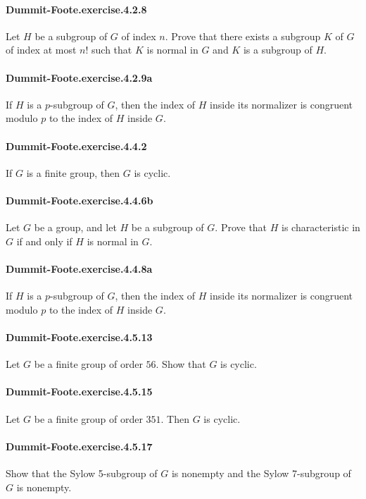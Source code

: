 \documentclass{article}
\begin{document}
\paragraph{Dummit-Foote.exercise.4.2.8} Let $H$ be a subgroup of $G$ of index $n$. Prove that there exists a subgroup $K$ of $G$ of index at most $n!$ such that $K$ is normal in $G$ and $K$ is a subgroup of $H$.

\paragraph{Dummit-Foote.exercise.4.2.9a} If $H$ is a $p$-subgroup of $G$, then the index of $H$ inside its normalizer is congruent modulo $p$ to the index of $H$ inside $G$.

\paragraph{Dummit-Foote.exercise.4.4.2} If $G$ is a finite group, then $G$ is cyclic.

\paragraph{Dummit-Foote.exercise.4.4.6b} Let $G$ be a group, and let $H$ be a subgroup of $G$. Prove that $H$ is characteristic in $G$ if and only if $H$ is normal in $G$.

\paragraph{Dummit-Foote.exercise.4.4.8a} If $H$ is a $p$-subgroup of $G$, then the index of $H$ inside its normalizer is congruent modulo $p$ to the index of $H$ inside $G$.

\paragraph{Dummit-Foote.exercise.4.5.13} Let $G$ be a finite group of order $56$. Show that $G$ is cyclic.

\paragraph{Dummit-Foote.exercise.4.5.15} Let $G$ be a finite group of order $351$. Then $G$ is cyclic.

\paragraph{Dummit-Foote.exercise.4.5.17} Show that the Sylow 5-subgroup of $G$ is nonempty and the Sylow 7-subgroup of $G$ is nonempty.
\end{document}
